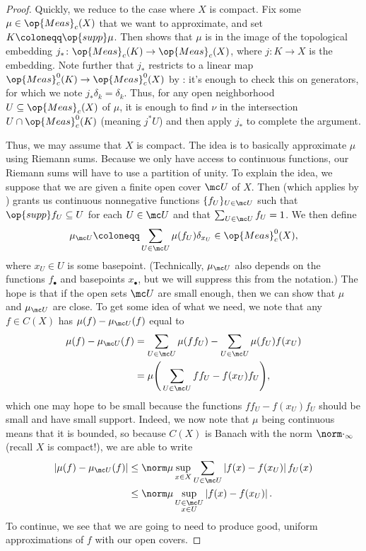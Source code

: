 \documentclass[../notes.tex]{subfiles}
\begin{document}
\begin{proof}
	Quickly, we reduce to the case where $X$ is compact. Fix some $\mu\in\op{Meas}_c(X)$ that we want to approximate, and set $K\coloneqq\op{supp}\mu$. Then  shows that $\mu$ is in the image of the topological embedding $j_*\colon\op{Meas}_c(K)\to\op{Meas}_c(X)$, where $j\colon K\to X$ is the embedding. Note further that $j_*$ restricts to a linear map $\op{Meas}_c^0(K)\to\op{Meas}_c^0(X)$ by : it's enough to check this on generators, for which we note $j_*\delta_k=\delta_k$. Thus, for any open neighborhood $U\subseteq\op{Meas}_c(X)$ of $\mu$, it is enough to find $\nu$ in the intersection $U\cap\op{Meas}_c^0(K)$ (meaning $j^*U$) and then apply $j_*$ to complete the argument.

	Thus, we may assume that $X$ is compact. The idea is to basically approximate $\mu$ using Riemann sums. Because we only have access to continuous functions, our Riemann sums will have to use a partition of unity. To explain the idea, we suppose that we are given a finite open cover $\mc U$ of $X$. Then  (which applies by ) grants us continuous nonnegative functions $\{f_U\}_{U\in\mc U}$ such that $\op{supp}f_U\subseteq U$ for each $U\in\mc U$ and that $\sum_{U\in\mc U}f_U=1$. We then define
	\[\mu_{\mc U}\coloneqq\sum_{U\in\mc U}\mu(f_U)\delta_{x_U}\in\op{Meas}_c^0(X),\]
	where $x_U\in U$ is some basepoint. (Technically, $\mu_{\mc U}$ also depends on the functions $f_\bullet$ and basepoints $x_\bullet$, but we will suppress this from the notation.) The hope is that if the open sets $\mc U$ are small enough, then we can show that $\mu$ and $\mu_{\mc U}$ are close. To get some idea of what we need, we note that any $f\in C(X)$ has $\mu(f)-\mu_{\mc U}(f)$ equal to
	\begin{align*}
		\mu(f)-\mu_{\mc U}(f) &= \sum_{U\in\mc U}\mu(ff_U)-\sum_{U\in\mc U}\mu(f_U)f(x_U) \\
		&= \mu\Bigg(\sum_{U\in\mc U}ff_U-f(x_U)f_U\Bigg),
	\end{align*}
	which one may hope to be small because the functions $ff_U-f(x_U)f_U$ should be small and have small support. Indeed, we now note that $\mu$ being continuous means that it is bounded, so because $C(X)$ is Banach with the norm $\norm\cdot_\infty$ (recall $X$ is compact!), we are able to write
	\begin{align*}
		\left|\mu(f)-\mu_{\mc U}(f)\right| &\le \norm\mu\sup_{x\in X}\sum_{U\in\mc U}\left|f(x)-f(x_U)\right|f_U(x) \\
		&\le \norm\mu\sup_{\substack{U\in\mc U\\x\in U}}\left|f(x)-f(x_U)\right|.
	\end{align*}
	To continue, we see that we are going to need to produce good, uniform approximations of $f$ with our open covers.


\end{proof}
\end{document}
